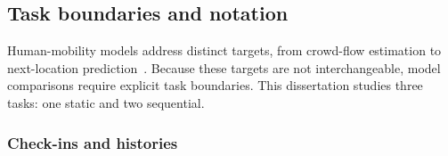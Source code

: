 \subsection{Task boundaries and notation}

Human-mobility models address distinct targets, from crowd-flow estimation to
next-location prediction~\cite{luca2021mobilitysurvey}. Because these targets are not
interchangeable, model comparisons require explicit task boundaries. This dissertation
studies three tasks: one static and two sequential.


\subsubsection{Check-ins and histories}

